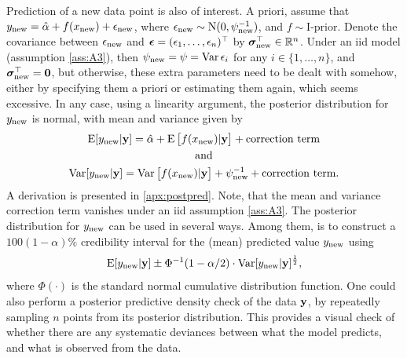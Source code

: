 Prediction of a new data point is also of interest.
A priori, assume that $y_{\text{new}} = \hat\alpha + f(x_{\text{new}}) + \epsilon_{\text{new}}$, where $\epsilon_{\text{new}} \sim \operatorname{N}(0,\psi^{-1}_{\text{new}})$, and $f\sim \text{I-prior}$.
Denote the covariance between $\epsilon_{\text{new}}$ and ${\bm\epsilon} = (\epsilon_1,\dots,\epsilon_n)^\top$ by ${\bm\sigma}_{\text{new}}^\top \in \mathbb{R}^n$.
Under an iid model (assumption \ref{ass:A3}), then $\psi_{\text{new}} = \psi = \operatorname{Var} \epsilon_i$ for any $i\in\{1,\dots,n\}$, and ${\bm\sigma}_{\text{new}}^\top={\mathbf 0}$, but otherwise, these extra parameters need to be dealt with somehow, either by specifying them a priori or estimating them again, which seems excessive.
In any case, using a linearity argument, the posterior distribution for $y_{\text{new}}$ is normal, with mean and variance given by
\begin{gather}
  \operatorname{E}[y_{\text{new}}|{\mathbf y}] = \hat\alpha + \operatorname{E} \big[ f(x_{\text{new}}) |{\mathbf y} \big] + \text{correction term} \\
  \text{and} \nonumber \\
  \operatorname{Var}[y_{\text{new}}|{\mathbf y}] 
  = \operatorname{Var}\big[f(x_{\text{new}})|{\mathbf y}\big] + \psi^{-1}_{\text{new}} + \text{correction term}.
\end{gather}
A derivation is presented in \autoref{apx:postpred}.
Note, that the mean and variance correction term vanishes under an iid assumption \ref{ass:A3}.
The posterior distribution for $y_{\text{new}}$ can be used in several ways. 
Among them, is to construct a $100(1 - \alpha)\%$ credibility interval for the (mean) predicted value $y_{\text{new}}$ using
\[
  \operatorname{E}[y_{\text{new}}|{\mathbf y}] \pm \Phi^{-1}(1 - \alpha/2) \cdot \operatorname{Var}[y_{\text{new}}|{\mathbf y}]^{\frac{1}{2}},
\]
where $\Phi(\cdot)$ is the standard normal cumulative distribution function.
One could also perform a posterior predictive density check of the data ${\mathbf y}$, by repeatedly sampling $n$ points from its posterior distribution.
This provides a visual check of whether there are any systematic deviances between what the model predicts, and what is observed from the data.

